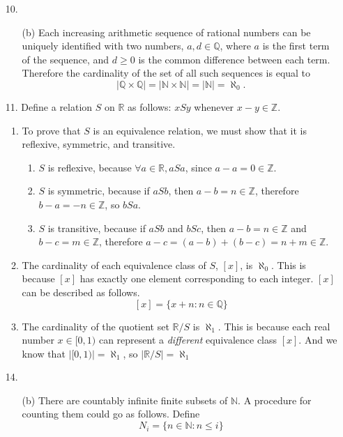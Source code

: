 \documentclass[fleqn]{article}
\begin{document}
\begin{enumerate}
	\item[10.]
	\begin{enumerate}
		\item[(b)]
		Each increasing arithmetic sequence of rational numbers can be uniquely identified with two numbers, \(a, d \in \mathbb{Q}\), where \(a\) is the first term of the sequence, and \(d \geq 0\) is the common difference between each term. Therefore the cardinality of the set of all such sequences is equal to
		\[|\mathbb{Q} \times \mathbb{Q}| = |\mathbb{N} \times \mathbb{N}| = |\mathbb{N}| = \aleph_0.\]
	\end{enumerate}

	\item[11.]
	Define a relation \(S\) on \(\mathbb{R}\) as follows: \(xSy\) whenever \(x - y \in \mathbb{Z}\).
	\begin{enumerate}
		\item %
		To prove that \(S\) is an equivalence relation, we must show that it is reflexive, symmetric, and transitive.
		\begin{enumerate}
			\item %
			\(S\) is reflexive, because \(\forall a \in \mathbb{R}, aSa\), since \(a - a = 0 \in \mathbb{Z}\).
			
			\item %
			\(S\) is symmetric, because if \(aSb\), then \(a - b = n \in \mathbb{Z}\), therefore \(b - a = -n \in \mathbb{Z}\), so \(bSa\).

			\item %
			\(S\) is transitive, because if \(aSb\) and \(bSc\), then \(a - b = n \in \mathbb{Z}\) and \(b - c = m \in \mathbb{Z}\), therefore \(a - c = (a - b) + (b - c) = n + m \in \mathbb{Z}\).
		\end{enumerate}
		
		\item %
		The cardinality of each equivalence class of \(S\), \([x]\), is \(\aleph_0\). This is because \([x]\) has exactly one element corresponding to each integer. \([x]\) can be described as follows.
		\[[x] = \{x + n : n \in \mathbb{Q}\}\]

		\item %
		The cardinality of the quotient set \(\mathbb{R}/S\) is \(\aleph_1\). This is because each real number \(x \in [0, 1)\) can represent a \textit{different} equivalence class \([x]\). And we know that \(|[0, 1)| = \aleph_1\), so \(|\mathbb{R}/S| = \aleph_1\)
	\end{enumerate}
\pagebreak
	\item[14.]
	\begin{enumerate}
		\item[(b)]
		There are countably infinite finite subsets of \(\mathbb{N}\). A procedure for counting them could go as follows. Define 
		\[N_i = \{n \in \mathbb{N} : n \leq i\}\]
		

\end{enumerate}
\end{enumerate}
\end{document}
